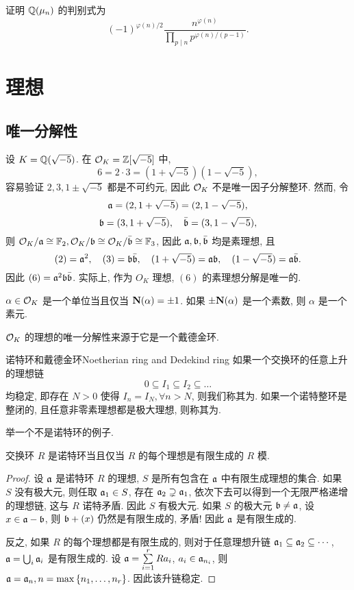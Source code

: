 \begin{exercise}
证明 ${\mathbb{Q}}(\mu_n)$ 的判别式为
	\[(-1)^{\varphi(n)/2}\frac{n^{\varphi(n)}}{\prod_{p\mid n}p^{\varphi(n)/(p-1)}}.\]
\end{exercise}



\section{理想}

\subsection{唯一分解性}
\begin{example}
设 $K={\mathbb{Q}}(\sqrt{-5})$. 在 ${\mathcal{O}}_K={\mathbb{Z}}[\sqrt{-5}]$ 中,
  \[6=2\cdot 3=(1+\sqrt{-5})(1-\sqrt{-5}),\]
容易验证 $2,3,1\pm\sqrt{-5}$ 都是不可约元, 因此 ${\mathcal{O}}_K$ 不是唯一因子分解整环. 然而, 令 
  \[{\mathfrak{a}}=(2,1+\sqrt{-5})=(2,1-\sqrt{-5}), \]
  \[{\mathfrak{b}}=(3,1+\sqrt{-5}),\quad \bar {{\mathfrak{b}}}=(3,1-\sqrt{-5}),\]
则 ${\mathcal{O}}_K/{\mathfrak{a}}\cong {\mathbb{F}}_2,{\mathcal{O}}_K/{\mathfrak{b}}\cong {\mathcal{O}}_K/\bar {{\mathfrak{b}}}\cong {\mathbb{F}}_3$, 因此 ${\mathfrak{a}},{\mathfrak{b}},\bar {{\mathfrak{b}}}$ 均是素理想, 且
  \[(2)={\mathfrak{a}}^2,\quad (3)={\mathfrak{b}}\bar {{\mathfrak{b}}},\quad (1+\sqrt{-5})={\mathfrak{a}}{\mathfrak{b}},\quad (1-\sqrt{-5})={\mathfrak{a}}\bar{{\mathfrak{b}}}.\]
因此 $(6)={\mathfrak{a}}^2 {\mathfrak{b}}\bar{{\mathfrak{b}}}$. 实际上, 作为 $O_K$ 理想, $(6)$ 的素理想分解是唯一的.
\end{example}

\begin{exercise}
$\alpha\in {\mathcal{O}}_K$ 是一个单位当且仅当 ${\mathbf{N}}(\alpha)=\pm 1$. 如果 $\pm{\mathbf{N}}(\alpha)$ 是一个素数, 则  $\alpha$ 是一个素元.
\end{exercise}

${\mathcal{O}}_K$ 的理想的唯一分解性来源于它是一个戴德金环.

\begin{definition}{诺特环和戴德金环}{Noetherian ring and Dedekind ring}
如果一个交换环的任意上升的理想链
  \[0\subseteq I_1\subseteq I_2\subseteq \dots \]
均稳定, 即存在 $N>0$ 使得 $I_n=I_N,\forall n>N$, 则我们称其为. 
如果一个诺特整环是整闭的, 且任意非零素理想都是极大理想, 则称其为.
\end{definition}

\begin{exercise}
举一个不是诺特环的例子.
\end{exercise}


\begin{proposition}{}{}
交换环 $R$ 是诺特环当且仅当 $R$ 的每个理想是有限生成的 $R$ 模.
\end{proposition}
\begin{proof}
设 ${\mathfrak{a}}$ 是诺特环 $R$ 的理想, $S$ 是所有包含在 ${\mathfrak{a}}$ 中有限生成理想的集合. 如果 $S$ 没有极大元, 则任取 ${\mathfrak{a}}_1\in S$, 存在 ${\mathfrak{a}}_2\supsetneq {\mathfrak{a}}_1$, 依次下去可以得到一个无限严格递增的理想链, 这与 $R$ 诺特矛盾. 因此 $S$ 有极大元. 如果 $S$ 的极大元 ${\mathfrak{b}}\neq {\mathfrak{a}}$, 设 $x\in{\mathfrak{a}}-{\mathfrak{b}}$, 则 ${\mathfrak{b}}+(x)$ 仍然是有限生成的, 矛盾! 因此 ${\mathfrak{a}}$ 是有限生成的.

反之, 如果 $R$ 的每个理想都是有限生成的, 则对于任意理想升链 ${\mathfrak{a}}_1\subseteq {\mathfrak{a}}_2\subseteq \cdots$, ${\mathfrak{a}}=\bigcup_i{\mathfrak{a}}_i$ 是有限生成的. 设 ${\mathfrak{a}}=\sum\limits_{i=1}^r Ra_i$, $a_i\in {\mathfrak{a}}_{n_i}$, 则 ${\mathfrak{a}}={\mathfrak{a}}_n,n=\max\left\{n_1,\dots,n_r\right\}$. 因此该升链稳定.
\end{proof}


